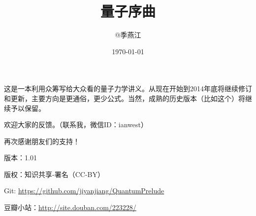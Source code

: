 \documentclass[twoside,a5paper,12pt]{article}
\title{量子序曲}
\author{@季燕江}
\date{\today}
\begin{document}
\pagestyle{headings}

\maketitle

这是一本利用众筹写给大众看的量子力学讲义。从现在开始到2014年底将继续修订和更新，主要方向是更通俗，更少公式。当然，成熟的历史版本（比如这个）将继续予以保留。

欢迎大家的反馈。（联系我，微信ID：ianwest）

再次感谢朋友们的支持！

版本：1.01

版权：知识共享-署名（CC-BY）

Git: \url{https://github.com/jiyanjiang/QuantumPrelude}

豆瓣小站：\url{http://site.douban.com/223228/}

%

\newpage
\setcounter{tocdepth}{2}
\tableofcontents


\newpage



\newpage



\newpage



\newpage



\newpage

%



\newpage



\newpage



\newpage



\newpage



\newpage



\newpage

\begin{appendix}



\newpage



\newpage



\end{appendix}



\end{document}
